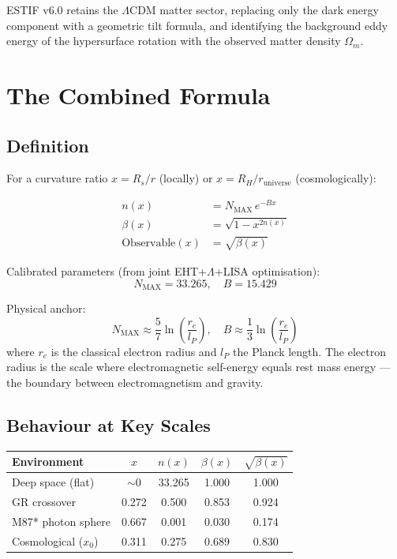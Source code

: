 \documentclass[12pt]{article}
\begin{document}
ESTIF v6.0 retains the $\Lambda$CDM matter sector, replacing only the dark energy
component with a geometric tilt formula, and identifying the background eddy energy
of the hypersurface rotation with the observed matter density $\Omega_m$.

\section{The Combined Formula}

\subsection{Definition}

For a curvature ratio $x = R_s/r$ (locally) or $x = R_H/r_\text{universe}$ (cosmologically):

\begin{align}
n(x) &= N_\text{MAX}\, e^{-Bx} \label{eq:n} \\
\beta(x) &= \sqrt{1 - x^{2n(x)}} \label{eq:beta} \\
\text{Observable}(x) &= \sqrt{\beta(x)} \label{eq:obs}
\end{align}

Calibrated parameters (from joint EHT+$\Lambda$+LISA optimisation):
\begin{equation}
N_\text{MAX} = 33.265, \quad B = 15.429
\end{equation}

Physical anchor:
\begin{equation}
N_\text{MAX} \approx \frac{5}{7}\ln\!\left(\frac{r_e}{l_P}\right), \quad
B \approx \frac{1}{3}\ln\!\left(\frac{r_e}{l_P}\right)
\end{equation}
where $r_e$ is the classical electron radius and $l_P$ the Planck length.
The electron radius is the scale where electromagnetic self-energy equals
rest mass energy --- the boundary between electromagnetism and gravity.

\subsection{Behaviour at Key Scales}

\begin{center}
\begin{tabular}{lcccc}
\toprule
Environment & $x$ & $n(x)$ & $\beta(x)$ & $\sqrt{\beta(x)}$ \\
\midrule
Deep space (flat) & $\sim 0$ & 33.265 & 1.000 & 1.000 \\
GR crossover & 0.272 & 0.500 & 0.853 & 0.924 \\
M87* photon sphere & 0.667 & 0.001 & 0.030 & 0.174 \\
Cosmological ($x_0$) & 0.311 & 0.275 & 0.689 & 0.830 \\
\bottomrule
\end{tabular}
\end{center}
\end{document}
